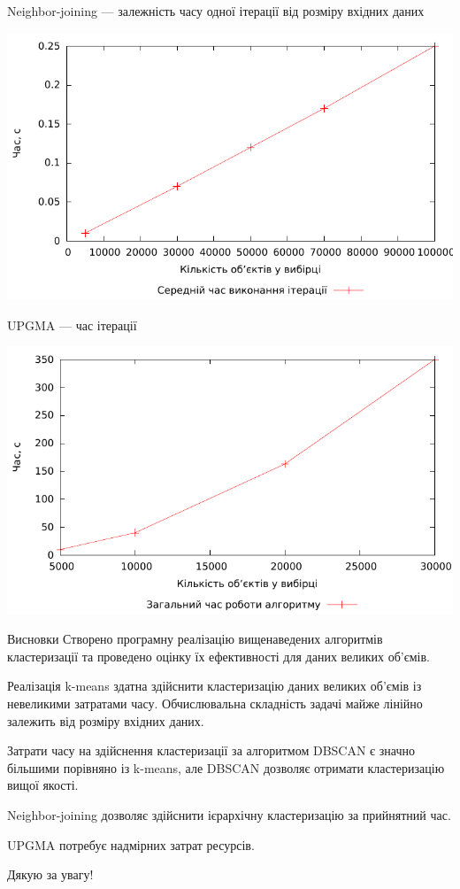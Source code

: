 \documentclass{beamer}
\begin{document}
    \begin{frame}{Neighbor-joining --- залежність часу одної ітерації від розміру вхідних даних}
        \begin{center}
            \includegraphics[scale=0.8]{nj_complexity.pdf}
        \end{center}
    \end{frame}
    
    
    \begin{frame}{UPGMA --- час ітерації}
        \begin{center}
            \includegraphics[scale=0.8]{upgma_real_complexity.pdf}
        \end{center}
    \end{frame}
    
    \begin{frame}{Висновки}
        Створено програмну реалізацію вищенаведених алгоритмів кластеризації та проведено оцінку їх ефективності для даних великих об’ємів.
        
        Реалізація k-means здатна здійснити кластеризацію даних великих об’ємів із невеликими затратами часу. Обчислювальна складність задачі майже лінійно залежить від розміру вхідних даних.
        
        Затрати часу на здійснення кластеризації за алгоритмом DBSCAN є значно більшими порівняно із k-means, але DBSCAN дозволяє отримати кластеризацію вищої якості.
        
        Neighbor-joining дозволяє здійснити ієрархічну кластеризацію за прийнятний час. 
        
        UPGMA потребує надмірних затрат ресурсів.
    \end{frame}
    
    \begin{frame}{Дякую за увагу!}
    \end{frame}
    
\end{document}
